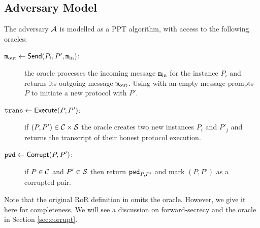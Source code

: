 
\subsection{Adversary Model}
The adversary $\mathcal{A}$ is modelled as a \ac{PPT} algorithm, with access to the following oracles:
\begin{description}
    \item[$\mathtt{m}_{\mathrm{out}}\gets\mathsf{Send}(P_i,P',\mathtt{m}_{\mathrm{in}})$:] the oracle processes the incoming message $\mathtt{m}_{\mathrm{in}}$ for the instance $P_i$ and returns its outgoing message $\mathtt{m}_{\mathrm{out}}$.
    	Using \Send with an empty message prompts $P$ to initiate a new protocol with $P'$.
    \item[$\mathtt{trans}\gets\mathsf{Execute}(P,P')$:] if $(P,P')\in\mathcal{C}\times\mathcal{S}$ the oracle creates two new instances $P_i$ and $P'_j$ and returns the transcript \trans of their honest protocol execution.
    \item[$\mathtt{pwd}\gets\mathsf{Corrupt}(P, P')$:] if $P\in\mathcal{C}$ and $P'\in\mathcal{S}$ then return $\mathtt{pwd}_{P,P'}$ and mark $(P,P')$ as a corrupted pair.
\end{description}

\noindent
Note that the original \ac{RoR} definition in \cite{Abdalla2005} omits the \Corrupt oracle.
However, we give it here for completeness.
We will see a discussion on forward-secrecy and the \Corrupt oracle in Section \ref{sec:corrupt}.

